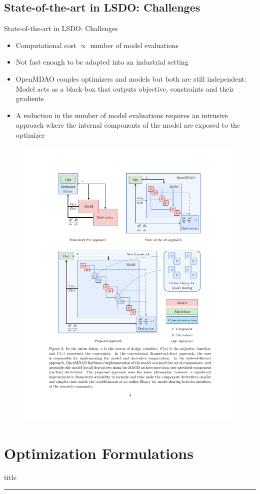 \documentclass{beamer}
\begin{document}
\subsection{State-of-the-art in LSDO: Challenges}
  \begin{frame}{State-of-the-art in LSDO: Challenges}
    \vspace{-10mm}
    \begin{itemize}
      \item Computational cost $\propto$ number of model evaluations
      \item Not fast enough to be adopted into an industrial setting
      \item OpenMDAO couples optimizers and models but both are still independent: Model acts as a black-box that outputs objective, constraints and their gradients
      \item A reduction in the number of model evaluations requires an intrusive approach where the internal components of the model are exposed to the optimizer
    \end{itemize}
    \vspace{1cm}
    \begin{figure}[ht]
      \centering
      \vspace{-15mm}
      \includegraphics[width=.4\linewidth]{Figures/Figure5}
      \vspace{-5mm}
      \label{fig:model_evals}
    \end{figure}
  \end{frame}


\section{Optimization Formulations}
  \begin{frame}[plain]
      \vfill
    \centering
    \begin{beamercolorbox}[sep=8pt,center,shadow=true,rounded=true]{title}
      \insertsectionhead\par%
      \color{oxfordblue}\noindent\rule{10cm}{1pt} \\
      \LARGE{\faFileTextO}
    \end{beamercolorbox}
    \vfill
  \end{frame}
\end{document}
